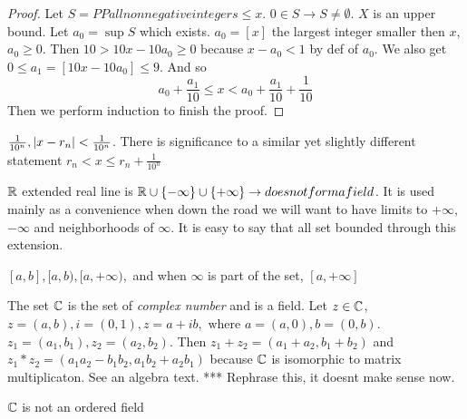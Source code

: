 \begin{proof}
	Let \( S = PPall nonnegative integers \le x \). 
	\( 0 \in S \rightarrow S \not = \emptyset \). 
	\( X \) is an upper bound. Let \( a_0 = \sup S \) which exists. 
	\( a_0 = [x] \) the largest integer smaller then \( x \), \( a_0 \ge 0 \). 
	Then \( 10 > 10x - 10a_0 \ge 0 \) because \( x - a_0 < 1 \) by def of \( a_0 \). 
	We also get 
	\( 0 \le a_1 = [10x - 10a_0] \le 9 \). And so 
	\[
		a_0 + \frac{a_1}{10} \le x < a_0 + \frac{a_1}{10} + \frac{1}{10}
	\]
	Then we perform induction to finish the proof.
\end{proof}
\begin{aside}
	\( \frac{1}{10^n}, |x-r_n| < \frac{1}{10^n} \).
	There is significance to a similar yet slightly different statement
	\( r_n < x \le r_n + \frac{1}{10^n} \)
\end{aside}

\( \mathbb{R} \) extended real line is \( \mathbb{R} \cup \left\{ -\infty \right\} \cup \left\{ +\infty
\right\} \rightarrow does not form a field \). It is used mainly as a convenience when down the
road we will want to have limits to \( + \infty \), \( -\infty \) and neighborhoods of \( \infty
\). It is easy to say that all set bounded through this extension.

\begin{notation}
	\( [a,b], [a,b), [a,+\infty), \) and when \( \infty \) is part of the set, \( [a,+\infty] \)
\end{notation}

\begin{definition}
	The set \( \mathbb{C} \) is the set of {\em complex number} and is a field. 
	Let \( z \in \mathbb{C} \), 
	\( z = (a,b), i = (0,1), z = a + ib, \text{ where } a = (a,0), b = (0,b) \).
	\( z_1 = (a_1, b_1), z_2 = (a_2,b_2) \). Then
	\( z_1 + z_2 = (a_1 + a_2, b_1 + b_2) \) and 
	\( z_1 * z_2 = \left( a_1a_2 - b_1b_2, a_1b_2 + a_2b_1  \right) \) 
	because \( \mathbb{C} \) is isomorphic to matrix multiplicaton. See an algebra text.
	*** Rephrase this, it doesnt make sense now.
\end{definition}

\begin{note}
	\( \mathbb{C} \) is not an ordered field
\end{note}
